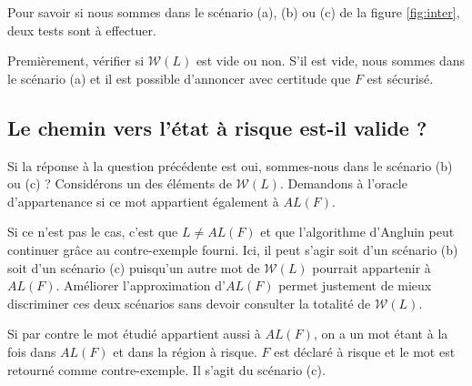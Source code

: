 Pour savoir si nous sommes dans le scénario (a), (b) ou (c) de la figure \ref{fig:inter}, deux tests sont à effectuer.

Premièrement, vérifier si $\mathcal{W}(L)$ est vide ou non. S'il est vide, nous sommes dans le scénario (a) et il est possible d'annoncer avec certitude que $F$ est sécurisé.

\subsection*{Le chemin vers l'état à risque est-il valide ?}

Si la réponse à la question précédente est oui, sommes-nous dans le scénario (b) ou (c) ?
Considérons un des éléments de $\mathcal{W}(L)$. Demandons à l'oracle d'appartenance si ce mot appartient également à $AL(F)$.

Si ce n'est pas le cas, c'est que $L\neq AL(F)$ et que l'algorithme d'Angluin peut continuer grâce au contre-exemple fourni. Ici, il peut s'agir soit d'un scénario (b) soit d'un scénario (c) puisqu'un autre mot de $\mathcal{W}(L)$ pourrait appartenir à $AL(F)$. Améliorer l'approximation d'$AL(F)$ permet justement de mieux discriminer ces deux scénarios sans devoir consulter la totalité de $\mathcal{W}(L)$.

Si par contre le mot étudié appartient aussi à $AL(F)$, on a un mot étant à la fois dans $AL(F)$ et dans la région à risque. $F$ est déclaré à risque et le mot est retourné comme contre-exemple. Il s'agit du scénario (c).
